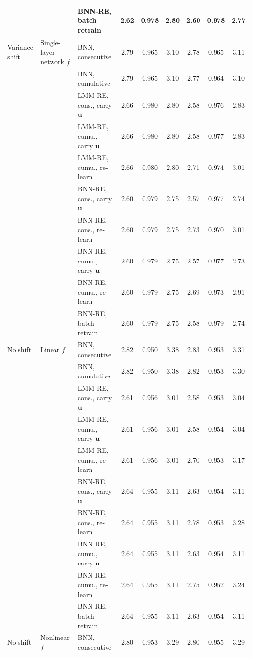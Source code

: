 \begin{tabular}{ll l ccc ccc}
 &  & BNN-RE, batch retrain & 2.62 & 0.978 & 2.80 & 2.60 & 0.978 & 2.77 \\
\hline
Variance shift & Single-layer network $f$ & BNN, consecutive & 2.79 & 0.965 & 3.10 & 2.78 & 0.965 & 3.11 \\
 &  & BNN, cumulative & 2.79 & 0.965 & 3.10 & 2.77 & 0.964 & 3.10 \\
 &  & LMM-RE, cons., carry $\bm u$ & 2.66 & 0.980 & 2.80 & 2.58 & 0.976 & 2.83 \\
 &  & LMM-RE, cumu., carry $\bm u$ & 2.66 & 0.980 & 2.80 & 2.58 & 0.977 & 2.83 \\
 &  & LMM-RE, cumu., re-learn & 2.66 & 0.980 & 2.80 & 2.71 & 0.974 & 3.01 \\
 &  & BNN-RE, cons., carry $\bm u$ & 2.60 & 0.979 & 2.75 & 2.57 & 0.977 & 2.74 \\
 &  & BNN-RE, cons., re-learn & 2.60 & 0.979 & 2.75 & 2.73 & 0.970 & 3.01 \\
 &  & BNN-RE, cumu., carry $\bm u$ & 2.60 & 0.979 & 2.75 & 2.57 & 0.977 & 2.73 \\
 &  & BNN-RE, cumu., re-learn & 2.60 & 0.979 & 2.75 & 2.69 & 0.973 & 2.91 \\
 &  & BNN-RE, batch retrain & 2.60 & 0.979 & 2.75 & 2.58 & 0.979 & 2.74 \\
\hline
No shift & Linear $f$ & BNN, consecutive & 2.82 & 0.950 & 3.38 & 2.83 & 0.953 & 3.31 \\
 &  & BNN, cumulative & 2.82 & 0.950 & 3.38 & 2.82 & 0.953 & 3.30 \\
 &  & LMM-RE, cons., carry $\bm u$ & 2.61 & 0.956 & 3.01 & 2.58 & 0.953 & 3.04 \\
 &  & LMM-RE, cumu., carry $\bm u$ & 2.61 & 0.956 & 3.01 & 2.58 & 0.954 & 3.04 \\
 &  & LMM-RE, cumu., re-learn & 2.61 & 0.956 & 3.01 & 2.70 & 0.953 & 3.17 \\
 &  & BNN-RE, cons., carry $\bm u$ & 2.64 & 0.955 & 3.11 & 2.63 & 0.954 & 3.11 \\
 &  & BNN-RE, cons., re-learn & 2.64 & 0.955 & 3.11 & 2.78 & 0.953 & 3.28 \\
 &  & BNN-RE, cumu., carry $\bm u$ & 2.64 & 0.955 & 3.11 & 2.63 & 0.954 & 3.11 \\
 &  & BNN-RE, cumu., re-learn & 2.64 & 0.955 & 3.11 & 2.75 & 0.952 & 3.24 \\
 &  & BNN-RE, batch retrain & 2.64 & 0.955 & 3.11 & 2.63 & 0.954 & 3.11 \\
\hline
No shift & Nonlinear $f$ & BNN, consecutive & 2.80 & 0.953 & 3.29 & 2.80 & 0.955 & 3.29 \\

\end{tabular}
